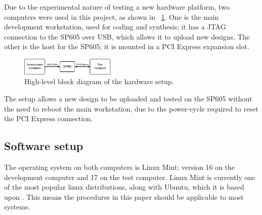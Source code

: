 Due to the experimental nature of testing a new hardware platform, two computers were used in this project, as shown in \figurename~\ref{fig:hardware-setup}.
One is the main development workstation, used for coding and synthesis; it has a JTAG connection to the SP605 over USB, which allows it to upload new designs.
The other is the host for the SP605; it is mounted in a PCI Express expansion slot.

\begin{figure}[!ht]
    \centering
    \includegraphics[width=0.40\textwidth]{figures/hardware-setup}
    \caption{High-level block diagram of the hardware setup.}
    \label{fig:hardware-setup}
\end{figure}

The setup allows a new design to be uploaded and tested on the SP605 without the need to reboot the main workstation, due to the power-cycle required to reset the PCI Express connection.


\subsection{Software setup}

The operating system on both computers is Linux Mint; version 16 on the development computer and 17 on the test computer.
Linux Mint is currently one of the most popular linux distributions, along with Ubuntu, which it is based upon \cite{distrowatch}.
This means the procedures in this paper should be applicable to most systems.



